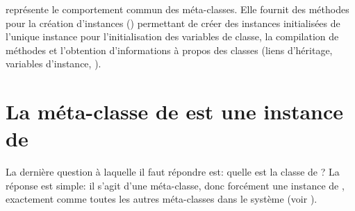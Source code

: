 \documentclass[a4paper,10pt,twoside]{book}
\begin{document}
 représente le comportement commun des méta-classes.
Elle fournit des méthodes pour la création d'instances () permettant de créer des instances initialisées de l'unique instance  pour l'initialisation des variables de classe, la compilation de méthodes et l'obtention d'informations à propos des classes (liens d'héritage, variables d'instance, \etc).


\section{La méta-classe de  est une instance de }

La dernière question à laquelle il faut répondre est: quelle est la classe de ?
La réponse est simple: il s'agit d'une méta-classe, donc forcément une instance de , exactement comme toutes les autres méta-classes dans le système (voir ).
\end{document}
